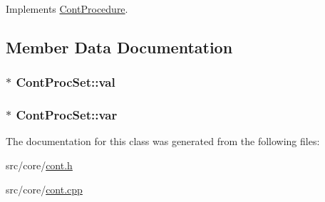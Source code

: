 Implements \hyperlink{a00067_a7f7adefe250a00b3778669ef649f03ac}{Cont\-Procedure}.



\subsection{Member Data Documentation}
\hypertarget{a00082_ab9e6e43f981128702808311a96c0c195}{
\subsubsection[{val}]{$\ast$ Cont\-Proc\-Set\-::val\hspace{0.3cm}{\ttfamily [private]}}}\label{a00082_ab9e6e43f981128702808311a96c0c195}
\hypertarget{a00082_a8739b6b42f2a36329c2224eeab49ac1d}{
\subsubsection[{var}]{$\ast$ Cont\-Proc\-Set\-::var\hspace{0.3cm}{\ttfamily [private]}}}\label{a00082_a8739b6b42f2a36329c2224eeab49ac1d}


The documentation for this class was generated from the following files\-:\begin{DoxyCompactItemize}
\item 
src/core/\hyperlink{a00218}{cont.\-h}\item 
src/core/\hyperlink{a00217}{cont.\-cpp}\end{DoxyCompactItemize}
